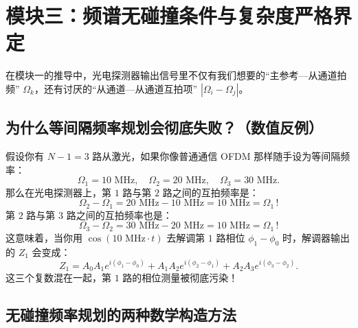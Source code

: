 \documentclass[UTF8, a4paper, 11pt]{ctexart}
\begin{document}
\section{模块三：频谱无碰撞条件与复杂度严格界定}

在模块一的推导中，光电探测器输出信号里不仅有我们想要的“主参考—从通道拍频” $\Omega_k$，还有讨厌的“从通道—从通道互拍项” $|\Omega_i - \Omega_j|$。

\subsection{为什么等间隔频率规划会彻底失败？（数值反例）}

假设你有 $N-1 = 3$ 路从激光，如果你像普通通信 OFDM 那样随手设为等间隔频率：
\[
    \Omega_1 = 10\text{ MHz}, \quad \Omega_2 = 20\text{ MHz}, \quad \Omega_3 = 30\text{ MHz}.
\]
那么在光电探测器上，第 $1$ 路与第 $2$ 路之间的互拍频率是：
\[
    \Omega_2 - \Omega_1 = 20\text{ MHz} - 10\text{ MHz} = 10\text{ MHz} = \Omega_1 \,!
\]
第 $2$ 路与第 $3$ 路之间的互拍频率也是：
\[
    \Omega_3 - \Omega_2 = 30\text{ MHz} - 20\text{ MHz} = 10\text{ MHz} = \Omega_1 \,!
\]
这意味着，当你用 $\cos(10\text{ MHz} \cdot t)$ 去解调第 $1$ 路相位 $\phi_1 - \phi_0$ 时，解调器输出的 $Z_1$ 会变成：
\[
    Z_1 = A_0 A_1 e^{i(\phi_1 - \phi_0)} + A_1 A_2 e^{i(\phi_2 - \phi_1)} + A_2 A_3 e^{i(\phi_3 - \phi_2)}.
\]
这三个复数混在一起，第 $1$ 路的相位测量被彻底污染！

\subsection{无碰撞频率规划的两种数学构造方法}
\end{document}
